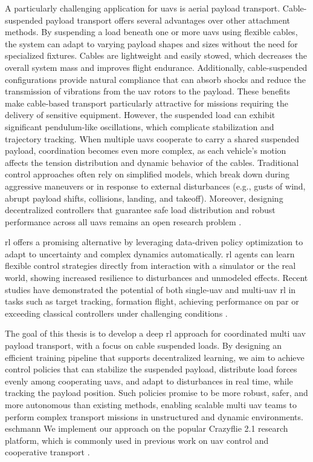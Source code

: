 A particularly challenging application for \glspl{uav} is aerial payload transport. Cable-suspended payload transport offers several advantages over other attachment methods. By suspending a load beneath one or more \glspl{uav} using flexible cables, the system can adapt to varying payload shapes and sizes without the need for specialized fixtures. Cables are lightweight and easily stowed, which decreases the overall system mass and improves flight endurance. Additionally, cable-suspended configurations provide natural compliance that can absorb shocks and reduce the transmission of vibrations from the \gls{uav} rotors to the payload. These benefits make cable-based transport particularly attractive for missions requiring the delivery of sensitive equipment. However, the suspended load can exhibit significant pendulum-like oscillations, which complicate stabilization and trajectory tracking. When multiple \glspl{uav} cooperate to carry a shared suspended payload, coordination becomes even more complex, as each vehicle's motion affects the tension distribution and dynamic behavior of the cables. Traditional control approaches often rely on simplified models, which break down during aggressive maneuvers or in response to external disturbances (e.g., gusts of wind, abrupt payload shifts, collisions, landing, and takeoff). Moreover, designing decentralized controllers that guarantee safe load distribution and robust performance across all \glspl{uav} remains an open research problem \cite{estevez_review_2024}.

\gls{rl} offers a promising alternative by leveraging data-driven policy optimization to adapt to uncertainty and complex dynamics automatically. \gls{rl} agents can learn flexible control strategies directly from interaction with a simulator or the real world, showing increased resilience to disturbances and unmodeled effects. Recent studies have demonstrated the potential of both single-\gls{uav} and multi-\gls{uav} \gls{rl} in tasks such as target tracking, formation flight, achieving performance on par or exceeding classical controllers under challenging conditions \autocite{Hwangbo2017ControlOA, kaufmann_champion-level_2023, Song2023ReachingTL, huang_collision_2024,Eschmann2024}.

The goal of this thesis is to develop a deep \gls{rl} approach for coordinated multi \gls{uav} payload transport, with a focus on cable suspended loads. By designing an efficient training pipeline that supports decentralized learning, we aim to achieve control policies that can stabilize the suspended payload, distribute load forces evenly among cooperating \glspl{uav}, and adapt to disturbances in real time, while tracking the payload position. Such policies promise to be more robust, safer, and more autonomous than existing methods, enabling scalable multi \gls{uav} teams to perform complex transport missions in unstructured and dynamic environments.
eschmann
We implement our approach on the popular Crazyflie 2.1 research platform, which is commonly used in previous work on \gls{uav} control and cooperative transport \autocite{wahba_kinodynamic_2024,huang_collision_2024,Eschmann2024,chen_what_2024}.

